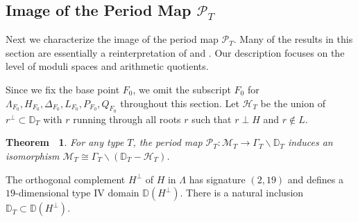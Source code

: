 \documentclass[12pt,reqno,a4paper]{amsart}
\newtheorem{thm}{Theorem~}[section]
\theoremstyle{remark}
\theoremstyle{definition}
\newcommand{\ZZ}{\mathbb{Z}}
\newcommand{\DD}{\mathbb{D}}
\newcommand{\Prd}{\mathscr{P}}
\newcommand{\calH}{\mathcal{H}}
\newcommand{\calM}{\mathcal{M}}
\newcommand{\bs}{\backslash}
\newcommand{\red}{\textcolor{red}}
\begin{document}
\subsection{Image of the Period Map $\Prd_T$}
\label{subsec: image of period map}
Next we characterize the image of the period map $\Prd_T$. Many of the results in this section are essentially a reinterpretation of \cite[Theorem 1.16]{urabe1988combinations} and \cite[Theorem 3.4.1]{degtyarev2008deformations}. Our description focuses on the level of moduli spaces and arithmetic quotients.


Since we fix the base point $F_0$, we omit the subscript $F_0$ for $\Lambda_{F_0},H_{F_0},\Delta_{F_0},L_{F_0},P_{F_0},Q_{F_0}$ throughout this section.
Let $\calH_T$ be the union of $r^{\perp}\subset \DD_T$ with $r$ running through all roots $r$ such that $r\perp H$ and $r\notin L$.


\begin{thm}
\label{thm: open}
For any type $T$, the period map $\Prd_T\colon\calM_T\to\Gamma_T\bs\DD_T$ induces an isomorphism $\calM_T \cong \Gamma_T\bs (\DD_T-\calH_T)$.
\end{thm}

The orthogonal complement $H^\perp$ of $H$ in $\Lambda$ has signature $(2,19)$ and defines a $19$-dimensional type IV domain $\DD(H^\perp)$.
There is a natural inclusion $\DD_T \subset \DD(H^\perp)$.
\end{document}
